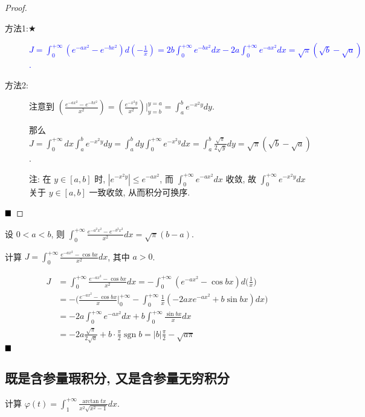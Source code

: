 \documentclass[lang=cn,newtx,10pt,scheme=chinese]{elegantbook}
\begin{document}
\begin{proof}
\begin{description}
    \item[方法1:$\bigstar$] \textcolor{blue}{$J = \int_0^{+\infty} (e^{-ax^2}-e^{-bx^2}) d(-\frac{1}{x}) = 2b\int_0^{+\infty} e^{-bx^2} dx - 2a\int_0^{+\infty} e^{-ax^2} dx = \sqrt{\pi}(\sqrt{b}-\sqrt{a})$.}

    \item[方法2:] 注意到 $(\frac{e^{-ax^2}-e^{-bx^2}}{x^2}) = \left(\frac{e^{-x^2y}}{x^2}\right) \Big|_{y=b}^{y=a} = \int_a^b e^{-x^2y} dy$.

    那么 $J = \int_0^{+\infty} dx \int_a^b e^{-x^2y} dy = \int_a^b dy \int_0^{+\infty} e^{-x^2y} dx = \int_a^b \frac{\sqrt{\pi}}{2\sqrt{y}} dy = \sqrt{\pi}(\sqrt{b}-\sqrt{a})$.

    注: 在 $y \in [a,b]$ 时, $|e^{-x^2y}| \le e^{-ax^2}$, 而 $\int_0^{+\infty} e^{-ax^2} dx$ 收敛, 故 $\int_0^{+\infty} e^{-x^2y} dx$ 关于 $y \in [a,b]$ 一致收敛, 从而积分可换序.
\end{description}
$\hfill \blacksquare$
\end{proof}

\begin{corollary*}
    设 $0 < a < b$, 则 $\int_{0}^{+\infty} \frac{e^{-a^2x^2} - e^{-b^2x^2}}{x^2} dx = \sqrt{\pi}(b-a)$.
\end{corollary*}

\begin{example}[$\bigstar \bigstar$]
计算 $J = \int_{0}^{+\infty} \frac{e^{-ax^2} - \cos bx}{x^2} dx$, 其中 $a > 0$.
\end{example}

\begin{solution}
\begin{align*}
J &= \int_0^{+\infty} \frac{e^{-ax^2} - \cos bx}{x^2} dx = - \int_0^{+\infty} (e^{-ax^2} - \cos bx) d\Big ( \frac{1}{x}\Big) \\
&= -\Big( \frac{e^{-ax^2} - \cos bx}{x} \Big|_0^{+\infty} - \int_0^{+\infty} \frac{1}{x} (-2ax e^{-ax^2} + b \sin bx) dx \Big) \\
&= -2a \int_0^{+\infty} e^{-ax^2} dx + b \int_0^{+\infty} \frac{\sin bx}{x} dx \\
&= -2a \frac{\sqrt{\pi}}{2\sqrt{a}} + b \cdot \frac{\pi}{2} \operatorname{sgn} b = |b|\frac{\pi}{2} - \sqrt{a\pi}
\end{align*}
$\hfill \blacksquare$
\end{solution}

\subsection{既是含参量瑕积分, 又是含参量无穷积分}
\begin{example}[$\bigstar \bigstar$]
计算 $\varphi(t) = \int_{1}^{+\infty} \frac{\arctan tx}{x^2\sqrt{x^2-1}} dx$.
\end{example}
\end{document}
